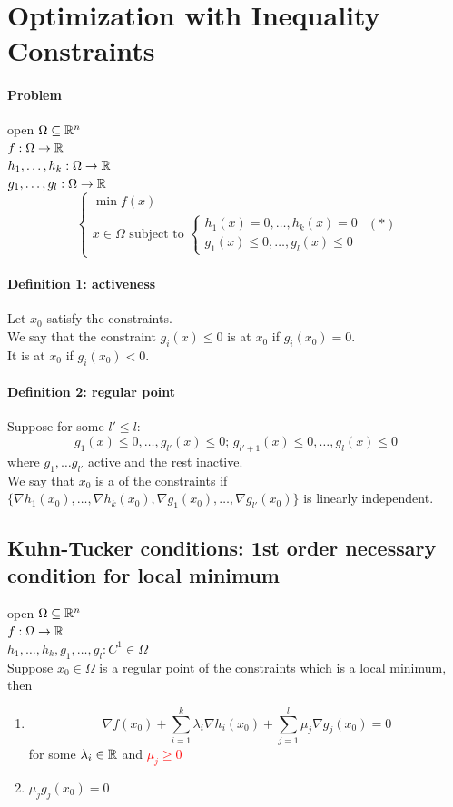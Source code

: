 \documentclass[11pt]{article}
\begin{document}
\section{Optimization with Inequality Constraints}
\paragraph{Problem}
open $\Omega \subseteq \mathbb{R}^n$\\
$f: \Omega \rightarrow \mathbb{R}$ \\
$h_1, \hdots, h_k: \Omega \rightarrow \mathbb{R}$ \\
$g_1, \hdots, g_l: \Omega \rightarrow \mathbb{R}$ \\
$$\begin{cases}
	\min f(x) \\
	x \in \Omega \text{ subject to } 
\begin{cases}
	h_1(x) = 0, \hdots, h_k(x) = 0 \\
	g_1(x) \leq 0, \hdots, g_l(x) \leq 0
\end{cases}
\end{cases}(*)$$

\paragraph{Definition 1: activeness}
Let $x_0$ satisfy the constraints. \\
We say that the constraint $g_i(x) \leq 0$ is  at $x_0$ if $g_i(x_0) = 0$. \\ It is  at $x_0$ if $g_i(x_0) < 0$.\\
\paragraph{Definition 2: regular point}
Suppose for some $l' \leq l$:
$$g_1(x) \leq 0, \hdots, g_{l'}(x) \leq 0; \, g_{l' + 1}(x) \leq 0, \hdots, g_l(x) \leq 0$$
where $g_1, \hdots g_{l'}$ active and the rest inactive. \\
We say that $x_0$ is a  of the constraints if \\
$\{\nabla h_1(x_0), \hdots, \nabla h_k(x_0), \nabla g_1(x_0), \hdots, \nabla g_{l'}(x_0)\}$ is linearly independent.

\subsection{Kuhn-Tucker conditions: 1st order necessary condition for local minimum}
open $\Omega \subseteq \mathbb{R}^n$\\
$f: \Omega \rightarrow \mathbb{R}$ \\
$h_1, \hdots, h_k, g_1, \hdots, g_l: C^1 \in \Omega$ \\
Suppose $x_0 \in \Omega$ is a regular point of the constraints which is a local minimum, then
\begin{enumerate}
	\item $$\nabla f(x_0) + \sum_{i=1}^k \lambda_i \nabla h_i(x_0) + \sum_{j=1}^l \mu_j \nabla g_j(x_0) = 0$$ for some $\lambda_i \in \mathbb{R}$ and \textcolor{red}{$\mu_j \geq 0$}
	\item $\mu_j g_j(x_0) = 0$
\end{enumerate}
\end{document}
